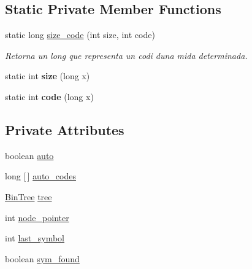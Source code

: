 \subsection*{Static Private Member Functions}
\begin{DoxyCompactItemize}
\item 
static long \hyperlink{classdomini_1_1algorithm_1_1Huffman_a2c035fb63cf7b945bc56cca90c1343a3}{size\+\_\+code} (int size, int code)
\begin{DoxyCompactList}\small\item\em Retorna un long que representa un codi d\textquotesingle{}una mida determinada. \end{DoxyCompactList}\item 
\mbox{\label{classdomini_1_1algorithm_1_1Huffman_a9ebf8a890196bc1f3af6917707c1096f}} 
static int {\bfseries size} (long x)
\item 
\mbox{\label{classdomini_1_1algorithm_1_1Huffman_a6ff0cdc5b992431ccfe8d77971ebf5e8}} 
static int {\bfseries code} (long x)
\end{DoxyCompactItemize}
\subsection*{Private Attributes}
\begin{DoxyCompactItemize}
\item 
boolean \hyperlink{classdomini_1_1algorithm_1_1Huffman_a1c2b6800e0b472c65f44ff9cf28a5b35}{auto}
\item 
long \mbox{[}$\,$\mbox{]} \hyperlink{classdomini_1_1algorithm_1_1Huffman_a0fa542dd4e914d8c0da5c070fe9f682f}{auto\+\_\+codes}
\item 
\hyperlink{classdomini_1_1utils_1_1BinTree}{Bin\+Tree} \hyperlink{classdomini_1_1algorithm_1_1Huffman_a6c010fa777f5601b7be908f8c876cf8e}{tree}
\item 
int \hyperlink{classdomini_1_1algorithm_1_1Huffman_a71e35eb22265910f918572b34eaa6b2f}{node\+\_\+pointer}
\item 
int \hyperlink{classdomini_1_1algorithm_1_1Huffman_a0da0a4274a58653bbe3e1c753adfbe38}{last\+\_\+symbol}
\item 
boolean \hyperlink{classdomini_1_1algorithm_1_1Huffman_a3453c53e74badc739d51208d35ba372d}{sym\+\_\+found}
\end{DoxyCompactItemize}


